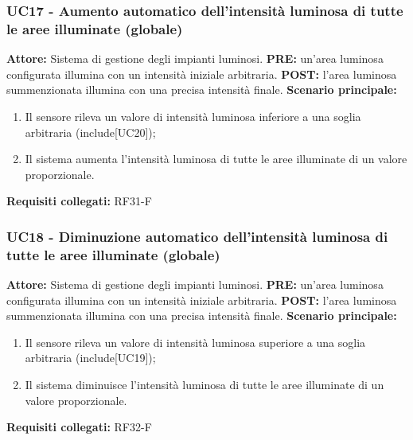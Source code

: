 \documentclass[a4paper, 12pt]{article}
\begin{document}
\subsubsection{UC17 - Aumento automatico dell'intensità luminosa di tutte le aree illuminate (globale)}
\textbf{Attore:} Sistema di gestione degli impianti luminosi.\newline
\textbf{PRE:} un'area luminosa configurata illumina con un intensità iniziale arbitraria.\newline
\textbf{POST:} l'area luminosa summenzionata illumina con una precisa intensità finale.\newline
\textbf{Scenario principale:}
\begin{enumerate}
    \item Il sensore rileva un valore di intensità luminosa inferiore a una soglia arbitraria (include[UC20]);
    \item Il sistema aumenta l’intensità luminosa di tutte le aree illuminate di un valore proporzionale.
\end{enumerate}
\textbf{Requisiti collegati:} RF31-F\newline

\subsubsection{UC18 - Diminuzione automatico dell'intensità luminosa di tutte le aree illuminate (globale)}
\textbf{Attore:} Sistema di gestione degli impianti luminosi.\newline
\textbf{PRE:} un'area luminosa configurata illumina con un intensità iniziale arbitraria.\newline
\textbf{POST:} l'area luminosa summenzionata illumina con una precisa intensità finale.\newline
\textbf{Scenario principale:}
\begin{enumerate}
    \item Il sensore rileva un valore di intensità luminosa superiore a una soglia arbitraria (include[UC19]);
    \item Il sistema diminuisce l’intensità luminosa di tutte le aree illuminate di un valore proporzionale.
\end{enumerate}
\textbf{Requisiti collegati:} RF32-F\newline
\end{document}
